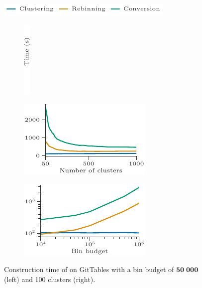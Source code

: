 \begin{figure}[t]
    \centering
    \includegraphics{figures/figure_15_legend.pdf}\\
    \begin{subfigure}[t]{.03\linewidth}
        \centering
        \includegraphics{figures/figure_15_label.pdf}
    \end{subfigure}%
    \begin{subfigure}[t]{.485\linewidth}
        \centering
        \includegraphics{figures/figure_15_a.pdf}
    \end{subfigure}%
    \begin{subfigure}[t]{.485\linewidth}
        \centering
        \includegraphics{figures/figure_15_b.pdf}
    \end{subfigure}%
    \caption{Construction time of \system{} on GitTables with a bin budget of $\boldsymbol{50\;000}$ (left) and 100 clusters (right).}
    \label{fig:construction_time_gittables}
\end{figure}

